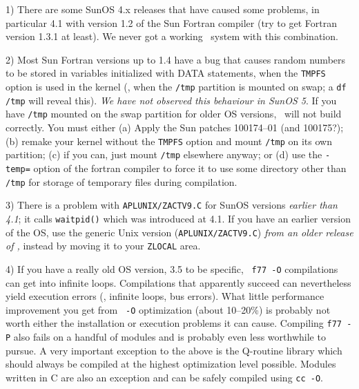 \item{1)}  There are some SunOS 4.x releases that have caused some
problems, in particular 4.1 with version 1.2 of the Sun Fortran compiler
(try to get Fortran version 1.3.1 at least).  We never got a working
\AIPS\ system with this combination.

\item{2)} Most Sun Fortran versions up to 1.4 have a bug that causes random
numbers to be stored in variables initialized with DATA statements, when
the {\tt TMPFS} option is used in the kernel (\ie, when the {\tt /tmp}
partition is mounted on swap; a {\tt df /tmp} will reveal this).  {\it
We have not observed this behaviour in SunOS 5}.  If you have
{\tt /tmp} mounted on the swap partition for older OS versions,
\AIPS\ will not build correctly.  You must either (a) Apply the Sun
patches 100174--01 (and 100175?); (b) remake your kernel without the
{\tt TMPFS} option and mount {\tt /tmp} on its own partition; (c) if you
can, just mount {\tt /tmp} elsewhere anyway; or (d) use the {\tt -temp=}
option of the fortran compiler to force it to use some directory other
than {\tt /tmp} for storage of temporary files during compilation.

\item{3)} There is a problem with {\tt \dol APLUNIX/ZACTV9.C} for SunOS
versions {\it earlier than 4.1\/}; it calls {\tt waitpid()} which was
introduced at 4.1.  If you have an earlier version of the OS, use the
generic Unix version ({\tt \dol APLUNIX/ZACTV9.C}) {\it from an older
release of \AIPS, } instead by moving it to
your {\tt\dol ZLOCAL} area.

\item{4)} If you have a really old OS version, 3.5 to be specific, {\tt
f77 -O} compilations can get into infinite loops.  Compilations that
apparently succeed can nevertheless yield execution errors (\eg, infinite
loops, bus errors).  What little performance improvement you get from {\tt
-O} optimization (about 10--20\%) is probably not worth either the
installation or execution problems it can cause.  Compiling {\tt f77 -P}
also fails on a handful of modules and is probably even less worthwhile to
pursue.  A very important exception to the above is the Q-routine library
which should always be compiled at the highest optimization level
possible.  Modules written in C are also an exception and can be safely
compiled using {\tt cc -O}.


